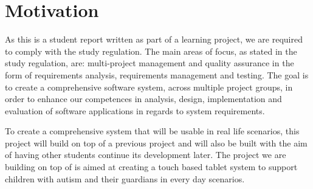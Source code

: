 \section{Motivation}
As this is a student report written as part of a learning project, we are required to comply with the study regulation. The main areas of focus, as stated in the study regulation, are: multi-project management and quality assurance in the form of requirements analysis, requirements management and testing. The goal is to create a comprehensive software system, across multiple project groups, in order to enhance our competences in analysis, design, implementation and evaluation of software applications in regards to system requirements. \cite{studyreg}

To create a comprehensive system that will be usable in real life scenarios, this project will build on top of a previous project and will also be built with the aim of having other students continue its development later. The project we are building on top of is aimed at creating a touch based tablet system to support children with autism and their guardians in every day scenarios.